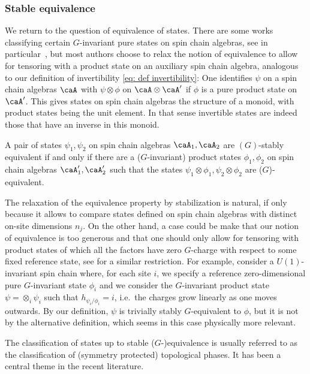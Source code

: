 \subsubsection{Stable equivalence}   \label{sec: stable equivalence}
We return to the question of equivalence of states.  There are some works classifying certain $G$-invariant pure states on spin chain algebras, see in particular~\cite{ogata2021classification}, 
but most authors \cite{kitaev2009periodic,chen_gu_wen_2011,kapustin2021classification} choose to relax the notion of equivalence to allow for tensoring with a product state on an auxiliary spin chain algebra, analogous to our 
definition
of invertibility \eqref{eq: def invertibility}: One identifies $\psi$ on a spin chain algebras $\caA$ with $\psi \otimes \phi$ on $\caA\otimes\caA'$ if $\phi$ is a pure product state on $\caA'$. This gives states on spin chain algebras the structure of a monoid, with product states being the unit element. In that sense invertible states are indeed those that have an inverse in this monoid.   
\begin{definition}
	A pair of states $\psi_1,\psi_2$ on spin chain algebras $\caA_1,\caA_2$ are $(G)$-stably equivalent if and only if there are a ($G$-invariant) product states $\phi_1,\phi_2$ on spin chain algebras $\caA'_1,\caA'_2$  such that the states $\psi_1\otimes \phi_1, \psi_2\otimes \phi_2$ are ($G$)-equivalent.
\end{definition}  
The relaxation of the equivalence property by stabilization is natural, if only because it allows to compare states defined on spin chain algebras with distinct on-site dimensions $n_j$.
On the other hand, a case could be make that our notion of equivalence is too generous and that one should only allow for tensoring with product states of which all the factors have zero $G$-charge with respect to some fixed reference state, see \cite{kapustin2021classification} for a similar restriction.  For example, consider a $U(1)$-invariant spin chain where, for each site $i$, we specify a reference zero-dimensional pure $G$-invariant state $\phi_i$ and we consider the $G$-invariant product state $\psi=\otimes_i \psi_i$ such that 
$h_{\psi_i/\phi_i}=i$, i.e.\ the charges grow linearly as one moves outwards.   By our definition, $\psi$ is trivially stably $G$-equivalent to $\phi$, but it is not by the alternative definition, which seems in this case physically more relevant. 

The classification of states up to stable ($G$-)equivalence is usually referred to as the classification of (symmetry protected) topological phases. It has been a central theme in the recent literature. 

